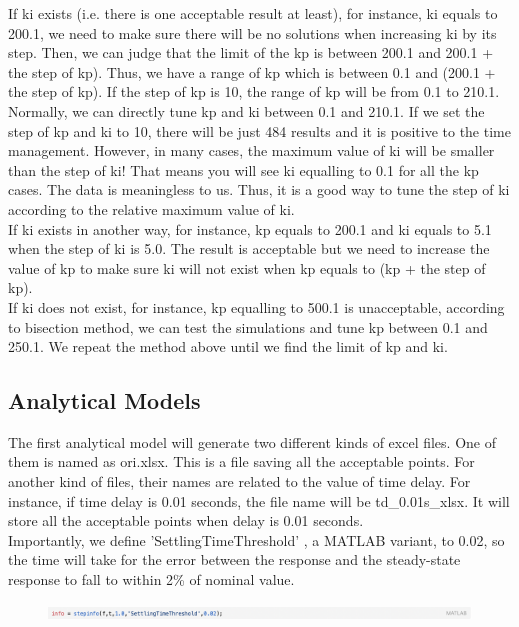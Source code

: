 \documentclass{report}
\begin{document}
If ki exists (i.e. there is one acceptable result at least), for instance, ki equals to 200.1, we need to make sure there will be no solutions when increasing ki by its step. Then, we can judge that the limit of the kp is between 200.1 and  200.1 + the step of kp). Thus, we have a range of kp which is between 0.1 and (200.1 + the step of kp). If the step of kp is 10, the range of kp will be from 0.1 to 210.1. Normally, we can directly tune kp and ki between 0.1 and 210.1. If we set the step of kp and ki to 10, there will be just 484 results and it is positive to the time management. However, in many cases, the maximum value of ki will be smaller than the step of ki! That means you will see ki equalling to 0.1 for all the kp cases. The data is meaningless to us. Thus, it is a good way to tune the step of ki according to the relative maximum value of ki.\\

If ki exists in another way, for instance, kp equals to 200.1 and ki equals to 5.1 when the step of ki is 5.0. The result is acceptable but we need to increase the value of kp to make sure ki will not exist when kp equals to (kp + the step of kp).\\

If ki does not exist, for instance, kp equalling to 500.1 is unacceptable, according to bisection method, we can test the simulations and tune kp between 0.1 and 250.1. We repeat the method above until we find the limit of kp and ki.\\


\subsection{Analytical Models} %
The first analytical model will generate two different kinds of excel files. One of them is named as ori.xlsx. This is a file saving all the acceptable points. For another kind of files, their names are related to the value of time delay. For instance, if time delay is 0.01 seconds, the file name will be td\_0.01s\_xlsx. It will store all the acceptable points when delay is 0.01 seconds.\\

Importantly, we define 'SettlingTimeThreshold' , a MATLAB variant, to 0.02, so the time will take for the error between the response and the steady-state response to fall to within 2\% of nominal value.\\

\begin{figure}[htbp]
\centering
\includegraphics[width = .999\textwidth]{figure/3_4_2_code4.png}
\label{3_4_2_code4}
\end{figure}
\end{document}
